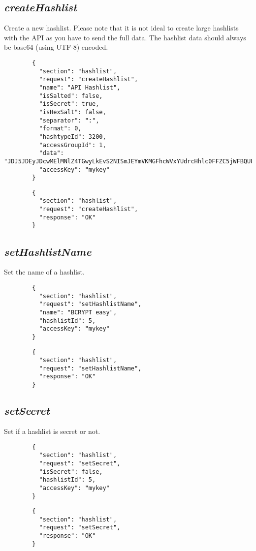 \subsection*{\textit{createHashlist}}
	Create a new hashlist. Please note that it is not ideal to create large hashlists with the API as you have to send the full data. The hashlist data should always be base64 (using UTF-8) encoded.
	{
		\color{blue}
		\begin{verbatim}
		{
		  "section": "hashlist",
		  "request": "createHashlist",
		  "name": "API Hashlist",
		  "isSalted": false,
		  "isSecret": true,
		  "isHexSalt": false,
		  "separator": ":",
		  "format": 0,
		  "hashtypeId": 3200,
		  "accessGroupId": 1,
		  "data": "JDJ5JDEyJDcwMElMNlZ4TGwyLkEvS2NISmJEYmVKMGFhcWVxYUdrcHhlc0FFZC5jWFBQUU4vWjNVN1c2",
		  "accessKey": "mykey"
		}
		\end{verbatim}
	}
	{
		\color{OliveGreen}
		\begin{verbatim}
		{
		  "section": "hashlist",
		  "request": "createHashlist",
		  "response": "OK"
		}
		\end{verbatim}
	}
\subsection*{\textit{setHashlistName}}
	Set the name of a hashlist.
	{
		\color{blue}
		\begin{verbatim}
		{
		  "section": "hashlist",
		  "request": "setHashlistName",
		  "name": "BCRYPT easy",
		  "hashlistId": 5,
		  "accessKey": "mykey"
		}
		\end{verbatim}
	}
	{
		\color{OliveGreen}
		\begin{verbatim}
		{
		  "section": "hashlist",
		  "request": "setHashlistName",
		  "response": "OK"
		}
		\end{verbatim}
	}
\subsection*{\textit{setSecret}}
	Set if a hashlist is secret or not.
	{
		\color{blue}
		\begin{verbatim}
		{
		  "section": "hashlist",
		  "request": "setSecret",
		  "isSecret": false,
		  "hashlistId": 5,
		  "accessKey": "mykey"
		}
		\end{verbatim}
	}
	{
		\color{OliveGreen}
		\begin{verbatim}
		{
		  "section": "hashlist",
		  "request": "setSecret",
		  "response": "OK"
		}
		\end{verbatim}
	}
